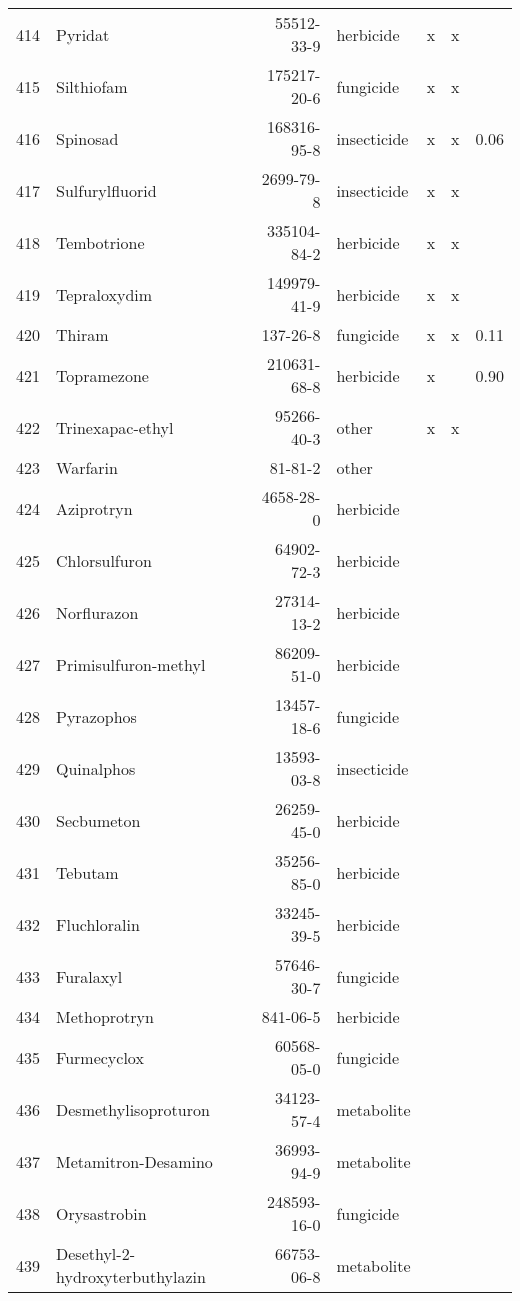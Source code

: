 \begin{longtable}{lp{3cm}rlp{0.5cm}p{0.5cm}p{1cm}}
  414 & Pyridat & 55512-33-9 & herbicide & x & x &  \\ 
  415 & Silthiofam & 175217-20-6 & fungicide & x & x &  \\ 
  416 & Spinosad & 168316-95-8 & insecticide & x & x & 0.06 \\ 
  417 & Sulfurylfluorid & 2699-79-8 & insecticide & x & x &  \\ 
  418 & Tembotrione & 335104-84-2 & herbicide & x & x &  \\ 
  419 & Tepraloxydim & 149979-41-9 & herbicide & x & x &  \\ 
  420 & Thiram & 137-26-8 & fungicide & x & x & 0.11 \\ 
  421 & Topramezone & 210631-68-8 & herbicide & x &  & 0.90 \\ 
  422 & Trinexapac-ethyl & 95266-40-3 & other & x & x &  \\ 
  423 & Warfarin & 81-81-2 & other &  &  &  \\ 
  424 & Aziprotryn & 4658-28-0 & herbicide &  &  &  \\ 
  425 & Chlorsulfuron & 64902-72-3 & herbicide &  &  &  \\ 
  426 & Norflurazon & 27314-13-2 & herbicide &  &  &  \\ 
  427 & Primisulfuron-methyl & 86209-51-0 & herbicide &  &  &  \\ 
  428 & Pyrazophos & 13457-18-6 & fungicide &  &  &  \\ 
  429 & Quinalphos & 13593-03-8 & insecticide &  &  &  \\ 
  430 & Secbumeton & 26259-45-0 & herbicide &  &  &  \\ 
  431 & Tebutam & 35256-85-0 & herbicide &  &  &  \\ 
  432 & Fluchloralin & 33245-39-5 & herbicide &  &  &  \\ 
  433 & Furalaxyl & 57646-30-7 & fungicide &  &  &  \\ 
  434 & Methoprotryn & 841-06-5 & herbicide &  &  &  \\ 
  435 & Furmecyclox & 60568-05-0 & fungicide &  &  &  \\ 
  436 & Desmethylisoproturon & 34123-57-4 & metabolite &  &  &  \\ 
  437 & Metamitron-Desamino & 36993-94-9 & metabolite &  &  &  \\ 
  438 & Orysastrobin & 248593-16-0 & fungicide &  &  &  \\ 
  439 & Desethyl-2-hydroxyterbuthylazin & 66753-06-8 & metabolite &  &  &  \\ 

\end{longtable}
